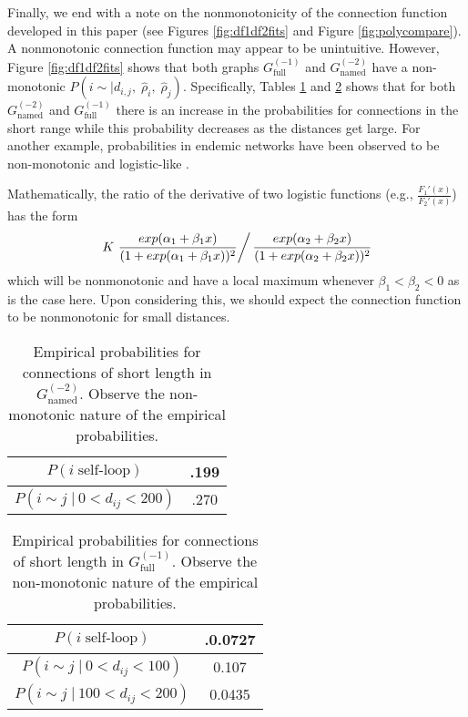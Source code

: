 \documentclass[11]{article}
\newcommand{\namedtwo}{G_{\textrm{named}}^{(-2)}}
\newcommand{\fullone}{G_{\textrm{full}}^{(-1)}}
\theoremstyle{remark}
\theoremstyle{definition}
\begin{document}
Finally, we end with a note on the nonmonotonicity of the connection function developed in this paper (see Figures \ref{fig:df1df2fits} and Figure \ref{fig:polycompare}). A nonmonotonic connection function may appear to be unintuitive. However, Figure \ref{fig:df1df2fits} shows that both graphs $\fullone$ and $\namedtwo$ have a non-monotonic $P(i\sim | d_{i,j}, \; \hat\rho_i, \; \hat\rho_j)$.  Specifically, Tables \ref{tab:nonmonotone} and  \ref{tab:nonmonotone2} shows that for both $\namedtwo$ and $\fullone$ there is an increase in the probabilities for connections in the short range while this probability decreases as the distances get large. For another example, probabilities in endemic networks have been observed to be non-monotonic and logistic-like \cite{lang2018analytic}. 

Mathematically, the ratio of the derivative of two logistic functions (e.g., $\frac{F_1'(x)}{F_2'(x)}$) has the form
 \[\left. K~ \frac{ exp(\alpha_1+\beta_1 x) }{ (1+exp(\alpha_1+\beta_1 x))^2 } \right/ \frac{ exp(\alpha_2+\beta_2 x) }{ (1+exp(\alpha_2+\beta_2 x))^2 } \]
which will be nonmonotonic and have a local maximum whenever $\beta_1 < \beta_2 < 0$ as is the case here. Upon considering this, we should expect the connection function to be nonmonotonic for small distances.

\begin{table}
\centering
\begin{tabular}{|c|c|}
\hline
 $P(i \; \text{self-loop})$     & .199  \\ \hline
 $P(i\sim j \;|\: 0<d_{ij}<200) $ & .270 \\ \hline
\end{tabular}
\caption{Empirical probabilities for connections of short length in $\namedtwo$. Observe the non-monotonic nature of the empirical probabilities.}
\label{tab:nonmonotone}
\end{table}

\begin{table}
\centering
\begin{tabular}{|c|c|}
\hline
 $P(i \; \text{self-loop})$     & .0.0727\\ \hline
 $P(i\sim j \;|\: 0<d_{ij}<100) $ & 0.107 \\ \hline
  $P(i\sim j \;|\: 100<d_{ij}<200) $ & 0.0435 \\ \hline
\end{tabular}
\caption{Empirical probabilities for connections of short length in $\fullone$. Observe the non-monotonic nature of the empirical probabilities.}
\label{tab:nonmonotone2}
\end{table}
\end{document}
